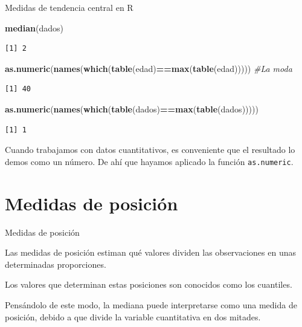 \documentclass[
  ignorenonframetext,
]{beamer}
\newenvironment{Shaded}{\begin{snugshade}}{\end{snugshade}}
\newcommand{\CommentTok}[1]{\textcolor[rgb]{0.56,0.35,0.01}{\textit{#1}}}
\newcommand{\KeywordTok}[1]{\textcolor[rgb]{0.13,0.29,0.53}{\textbf{#1}}}
\newcommand{\NormalTok}[1]{#1}
\newcommand{\OperatorTok}[1]{\textcolor[rgb]{0.81,0.36,0.00}{\textbf{#1}}}
\begin{document}
\begin{frame}[fragile]{Medidas de tendencia central en R}
\protect\hypertarget{medidas-de-tendencia-central-en-r-1}{}

\begin{Shaded}
\begin{Highlighting}[]
\KeywordTok{median}\NormalTok{(dados)}
\end{Highlighting}
\end{Shaded}

\begin{verbatim}
[1] 2
\end{verbatim}

\begin{Shaded}
\begin{Highlighting}[]
\KeywordTok{as.numeric}\NormalTok{(}\KeywordTok{names}\NormalTok{(}\KeywordTok{which}\NormalTok{(}\KeywordTok{table}\NormalTok{(edad)}\OperatorTok{==}\KeywordTok{max}\NormalTok{(}\KeywordTok{table}\NormalTok{(edad))))) }\CommentTok{#La moda}
\end{Highlighting}
\end{Shaded}

\begin{verbatim}
[1] 40
\end{verbatim}

\begin{Shaded}
\begin{Highlighting}[]
\KeywordTok{as.numeric}\NormalTok{(}\KeywordTok{names}\NormalTok{(}\KeywordTok{which}\NormalTok{(}\KeywordTok{table}\NormalTok{(dados)}\OperatorTok{==}\KeywordTok{max}\NormalTok{(}\KeywordTok{table}\NormalTok{(dados)))))}
\end{Highlighting}
\end{Shaded}

\begin{verbatim}
[1] 1
\end{verbatim}

Cuando trabajamos con datos cuantitativos, es conveniente que el
resultado lo demos como un número. De ahí que hayamos aplicado la
función \texttt{as.numeric}.

\end{frame}

\hypertarget{medidas-de-posiciuxf3n}{%
\section{Medidas de posición}\label{medidas-de-posiciuxf3n}}

\begin{frame}{Medidas de posición}
\protect\hypertarget{medidas-de-posiciuxf3n-1}{}

Las medidas de posición estiman qué valores dividen las observaciones en
unas determinadas proporciones.

Los valores que determinan estas posiciones son conocidos como los
cuantiles.

Pensándolo de este modo, la mediana puede interpretarse como una medida
de posición, debido a que divide la variable cuantitativa en dos
mitades.

\end{frame}
\end{document}
